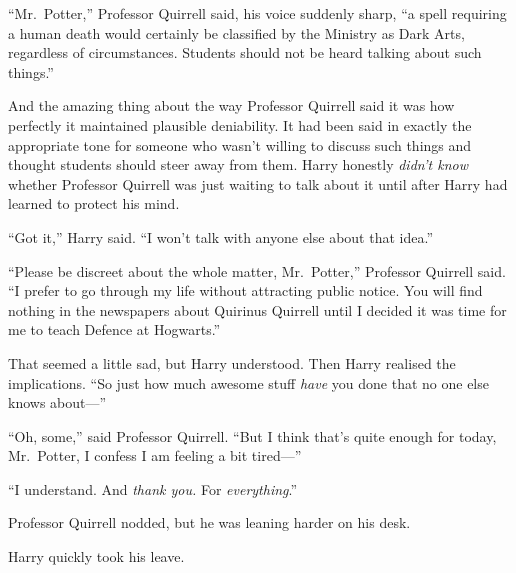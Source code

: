 ``Mr.~Potter,'' Professor Quirrell said, his voice suddenly sharp, ``a
spell requiring a human death would certainly be classified by the
Ministry as Dark Arts, regardless of circumstances. Students should not
be heard talking about such things.''

And the amazing thing about the way Professor Quirrell said it was how
perfectly it maintained plausible deniability. It had been said in
exactly the appropriate tone for someone who wasn't willing to discuss
such things and thought students should steer away from them. Harry
honestly \emph{didn't know} whether Professor Quirrell was just waiting
to talk about it until after Harry had learned to protect his mind.

``Got it,'' Harry said. ``I won't talk with anyone else about that
idea.''

``Please be discreet about the whole matter, Mr.~Potter,'' Professor
Quirrell said. ``I prefer to go through my life without attracting
public notice. You will find nothing in the newspapers about Quirinus
Quirrell until I decided it was time for me to teach Defence at
Hogwarts.''

That seemed a little sad, but Harry understood. Then Harry realised the
implications. ``So just how much awesome stuff \emph{have} you done that
no one else knows about---''

``Oh, some,'' said Professor Quirrell. ``But I think that's quite enough
for today, Mr.~Potter, I confess I am feeling a bit tired---''

``I understand. And \emph{thank you.} For \emph{everything}.''

Professor Quirrell nodded, but he was leaning harder on his desk.

Harry quickly took his leave.

